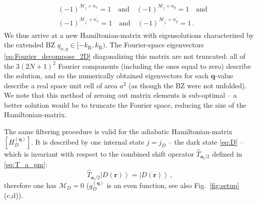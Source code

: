 \documentclass[aps,pra,twocolumn,showpacs,superscriptaddress,floatfix,longbibliography]{revtex4-1}
\def\kr{k_{\mathrm R}}                            			%
\begin{document}
\begin{appendix}
\begin{gather}
\begin{aligned}
& (-1)^{\mathcal{M}_{j} + n_x}= 1 \quad \text{and} \quad (-1)^{\mathcal{M}_j + n_y}=1 \quad \text{and} \\
& (-1)^{\mathcal{M}_{j^{\prime}} + n^{\prime}_x}= 1 \quad \text{and} \quad (-1)^{\mathcal{M}_{j^{\prime}} + n^{\prime}_y}=1 \, .
\end{aligned}
\end{gather}
%
We thus arrive at a new Hamiltonian-matrix with eigensolutions characterized by the extended BZ $q_{x,y} \in [-\kr,\kr)$. The Fourier-space eigenvectors \eqref{eq:Fourier_decompose_2D} diagonalizing this matrix are not truncated: all of the $3(2N+1)^2$ Fourier components (including the ones equal to zero) describe the solution, and so the numerically obtained eigenvectors for each $\boldsymbol{q}$-value describe a real space unit cell of area $a^2$ (as though the BZ were not unfolded). We note that this method of zeroing out matrix elements is sub-optimal -- a better solution would be to truncate the Fourier space, reducing the size of the Hamiltonian-matrix.

The same filtering procedure is valid for the adiabatic Hamiltonian-matrix $[H^{(\boldsymbol{q})}_D]$. It is described by one internal state $j=j_D$ -- the dark state \eqref{eq:D} -- which is invariant with respect to the combined shift operator $\hat{T}_{\mathbf{a}_l /2}$ defined in \eqref{eq:T_a_pm}:
%
\begin{equation}
 \hat{T}_{\mathbf{a}_l /2} \left|D(\boldsymbol{r})\right\rangle =\left|D(\boldsymbol{r})\right\rangle \,  , \label{eq:shift-dark}
 \end{equation}
%
therefore one has $\mathcal{M}_D = 0$ ($g_D^{(\boldsymbol{q})}$ is an even function, see also Fig.~\ref{fig:setup}(c,d)). 

\end{appendix}

%

\end{document}
